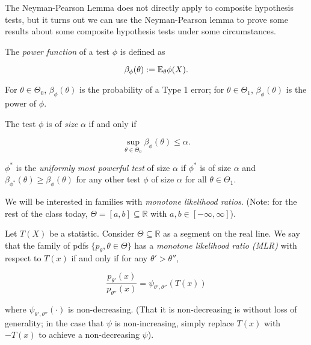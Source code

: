 The Neyman-Pearson Lemma does not directly apply to composite hypothesis tests, but it turns out we can use the Neyman-Pearson lemma to prove some results about some composite hypothesis tests under some circumstances.

\begin{definition}

The \textit{power function} of a test \(\phi\) is defined as

\[
\beta_\phi(\theta) := \E_\theta \phi(X).
\]

\end{definition}

\begin{remark}

For \(\theta \in \Theta_0\), \(\beta_\phi(\theta)\) is the probability of a Type 1 error; for \(\theta \in \Theta_1\), \(\beta_\phi(\theta)\) is the power of \(\phi\).

\end{remark}

\begin{definition}

The test \(\phi\) is of \textit{size} \(\alpha\) if and only if 

\[
\sup_{\theta \in \Theta_0} \beta_\phi(\theta) \leq \alpha.
\]

\end{definition}

\begin{definition}

\(\phi^*\) is the \textit{uniformly most powerful test} of size \(\alpha\) if \(\phi^*\) is of size \(\alpha\) and \(\beta_{\phi^*}(\theta) \geq \beta_\phi(\theta)\) for any other test \(\phi\) of size \(\alpha\) for all \(\theta \in \Theta_1\).

\end{definition}

We will be interested in families with \textit{monotone likelihood ratios}. (Note: for the rest of the class today, \(\Theta = [a, b] \subseteq \mathbb{R}\) with \(a, b \in [-\infty, \infty]\)). 

\begin{definition}

Let \(T(X)\) be a statistic. Consider \(\Theta \subseteq \mathbb{R}\) as a segment on the real line. We say that the family of pdfs \(\{p_\theta, \theta \in \Theta\}\) has a \textit{monotone likelihood ratio (MLR)} with respect to \(T(x)\) if and only if for any \(\theta' > \theta''\), 

\[
\frac{p_{\theta'}(x)}{p_{\theta''}(x)} = \psi_{\theta', \theta''}(T(x))
\]

where \(\psi_{\theta', \theta''}(\cdot)\) is non-decreasing. (That it is non-decreasing is without loss of generality; in the case that \(\psi\) is non-increasing, simply replace \(T(x)\) with \(-T(x)\) to achieve a non-decreasing \(\psi\)).

\end{definition}

